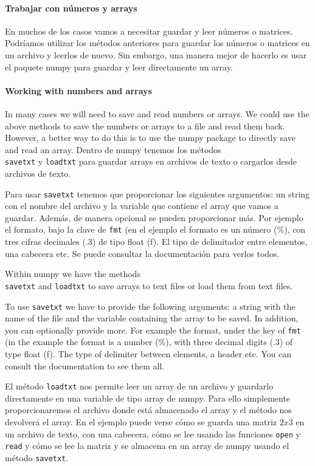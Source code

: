 \begin{paracol}{2}
\paragraph*{Trabajar con números y arrays}
 En muchos de los casos vamos a necesitar guardar y leer números o matrices. Podríamos utilizar los métodos anteriores para guardar los números o matrices en un archivo y leerlos de nuevo. Sin embargo, una manera mejor de hacerlo es usar el paquete numpy para guardar y leer directamente un array.
 \switchcolumn
 \paragraph*{Working with numbers and arrays}
 In many cases we will need to save and read numbers or arrays. We could use the above methods to save the numbers or arrays to a file and read them back. However, a better way to do this is to use the numpy package to directly save and read an array.
 \switchcolumn
 Dentro de numpy tenemos los métodos\\ \texttt{savetxt} y \texttt{loadtxt} para guardar arrays en archivos de texto o cargarlos desde archivos de texto. 

 Para usar \texttt{savetxt} tenemos que proporcionar los siguientes argumentos: un string con el nombre del archivo y la variable que contiene el array que vamos a guardar. Además, de manera opcional se pueden proporcionar más. Por ejemplo el formato, bajo la clave de \texttt{fmt} (en el ejemplo el formato es un número (\%), con tres cifras decimales ($.3$) de tipo float (f). El tipo de delimitador entre elementos, una cabecera etc. Se puede consultar la documentación para verlos todos.
 
 \switchcolumn

 Within numpy we have the methods\\ \texttt{savetxt} and \texttt{loadtxt} to save arrays to text files or load them from text files. 

 To use \texttt{savetxt} we have to provide the following arguments: a string with the name of the file and the variable containing the array to be saved. In addition, you can optionally provide more. For example the format, under the key of \texttt{fmt} (in the example the format is a number (\%), with three decimal digits ($.3$) of type float (f). The type of delimiter between elements, a header etc. You can consult the documentation to see them all.

 \switchcolumn
 El método \texttt{loadtxt} nos permite leer un array de un archivo y guardarlo directamente en una variable de tipo array de numpy. Para ello simplemente proporcionaremos el archivo donde está almacenado el array y el método nos devolverá el array. En el ejemplo puede verse cómo se guarda una matriz $2x3$ en un archivo de texto, con una cabecera, cómo se lee usando las funciones \texttt{open} y \texttt{read} y cómo se lee la matriz y se almacena en un array de numpy usando el método \texttt{savetxt}.
 

\end{paracol}
